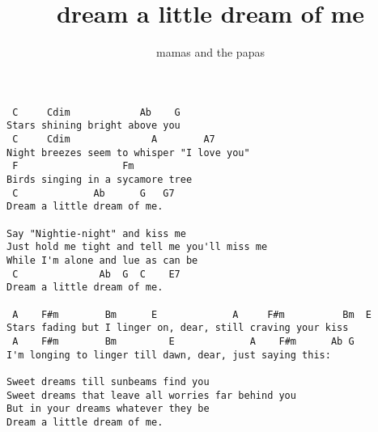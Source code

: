 \author{mamas and the papas}
\title{dream a little dream of me}
\maketitle
\begin{verbatim}
 C     Cdim            Ab    G 
Stars shining bright above you
 C     Cdim              A        A7
Night breezes seem to whisper "I love you"
 F                  Fm
Birds singing in a sycamore tree
 C             Ab      G   G7
Dream a little dream of me.

Say "Nightie-night" and kiss me
Just hold me tight and tell me you'll miss me
While I'm alone and lue as can be
 C              Ab  G  C    E7
Dream a little dream of me.

 A    F#m        Bm      E             A     F#m          Bm  E
Stars fading but I linger on, dear, still craving your kiss
 A    F#m        Bm         E             A    F#m      Ab G
I'm longing to linger till dawn, dear, just saying this:

Sweet dreams till sunbeams find you
Sweet dreams that leave all worries far behind you
But in your dreams whatever they be
Dream a little dream of me.
\end{verbatim}